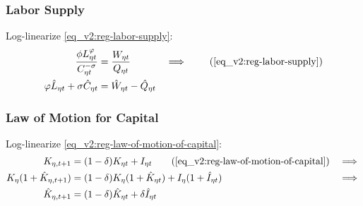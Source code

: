 \documentclass[../thesis.tex]{subfiles}
\begin{document}
\begin{comment}
	\subsubsection*{Regional Terms of Trade}
	
	Log-linearize \ref{eq_v2:reg-total-expense-level-2}:
	\begin{align}
		\hat{Q}_{1t} &= \hat{Q}_{2t} \label{eq_v2:reg-total-expense-level-2-ll}
	\end{align}
\end{comment}


\subsubsection*{Labor Supply}

Log-linearize \ref{eq_v2:reg-labor-supply}:
\begin{alignat}{2}
	\frac{\phi L_{\eta t}^{\varphi}}{C_{\eta t}^{-\sigma}} &= \frac{W_{\eta t}}{Q_{\eta t}} &\implies \tag{\ref{eq_v2:reg-labor-supply}} \\
	\varphi \hat{L}_{\eta t} + \sigma \hat{C}_{\eta t} &= \hat{W}_{\eta t} - \hat{Q}_{\eta t} & \label{eq_v2:reg-ll-labor-supply}
\end{alignat}


\subsubsection*{Law of Motion for Capital}

Log-linearize \ref{eq_v2:reg-law-of-motion-of-capital}:
\begin{alignat}{2}
	K_{\eta,t+1} &= (1 - \delta) K_{\eta t} + I_{\eta t} \tag{\ref{eq_v2:reg-law-of-motion-of-capital}} &\implies \\
	K_{\eta} (1 + \hat{K}_{\eta, t+1}) &= (1-\delta) K_{\eta} (1 + \hat{K}_{\eta t}) + I_{\eta} (1 + \hat{I}_{\eta t}) &\implies \nonumber \\
	\hat{K}_{\eta, t+1} &= (1-\delta) \hat{K}_{\eta t} + \delta \hat{I}_{\eta t} \label{eq_v2:reg-ll-law-of-motion-for-capital}
\end{alignat}
\end{document}
